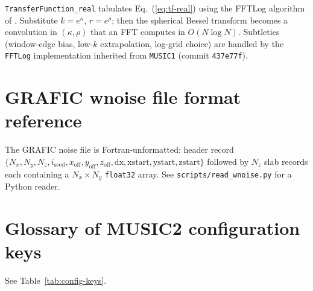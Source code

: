 \documentclass[12pt]{article}
\newcommand{\code}[1]{\texttt{#1}}
\begin{document}
\code{TransferFunction\_real} tabulates Eq.~(\ref{eq:tf-real}) using
the FFTLog algorithm of \citet{Talman1978, Hamilton2000}.  Substitute
$k = e^\kappa$, $r = e^\rho$; then the spherical Bessel transform
becomes a convolution in $(\kappa, \rho)$ that an FFT computes in
$O(N \log N)$.  Subtleties (window-edge bias, low-$k$ extrapolation,
log-grid choice) are handled by the \code{FFTLog} implementation
inherited from \texttt{MUSIC1} (commit \texttt{437e77f}).

\section{GRAFIC wnoise file format reference}
\label{app:grafic}

The GRAFIC noise file is Fortran-unformatted: header record
$\{N_x, N_y, N_z, i_\mathrm{seed}, x_\mathrm{off}, y_\mathrm{off}, z_\mathrm{off}, \mathrm{dx}, \mathrm{xstart}, \mathrm{ystart}, \mathrm{zstart}\}$ followed by $N_z$ slab records each containing a
$N_x \times N_y$ \code{float32} array.  See
\code{scripts/read\_wnoise.py} for a Python reader.

\section{Glossary of MUSIC2 configuration keys}
\label{app:config-keys}

See Table~\ref{tab:config-keys}.
\end{document}
